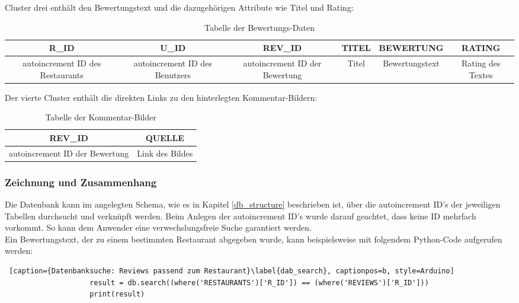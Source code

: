 \documentclass[a4paper,oneside,12pt]{report}
\begin{document}
			 		Cluster drei enthält den Bewertungstext und die dazugehörigen Attribute wie Titel und Rating:
			 		
			 		\begin{table}[H]
			 			\centering
			 			\begin{tabular}{cccccc}
			 				\toprule
			 				\tiny \bf R\_ID & \tiny \bf U\_ID & \tiny \bf REV\_ID & \tiny \bf TITEL & \tiny \bf BEWERTUNG & \tiny \bf RATING\\
			 				\midrule
			 				\tiny autoincrement ID des Restaurants & \tiny autoincrement ID des Benutzers & \tiny autoincrement ID der Bewertung & \tiny Titel & \tiny Bewertungstext & \tiny Rating des Textes\\
			 				\bottomrule
			 			\end{tabular}
			 			\caption[Bewertungs Tabelle]{Tabelle der Bewertungs-Daten}
			 			\label{tab_rev}
			 		\end{table}
				 	
				 	Der vierte Cluster enthält die direkten Links zu den hinterlegten Kommentar-Bildern:
				 	
				 	\begin{table}[H]
				 		\centering
				 		\begin{tabular}{cc}
				 			\toprule
				 			\tiny \bf REV\_ID & \tiny \bf QUELLE\\
				 			\midrule
				 			\tiny autoincrement ID der Bewertung & \tiny Link des Bildes\\
				 			\bottomrule
				 		\end{tabular}
				 		\caption[Bilder Thotelabelle]{Tabelle der Kommentar-Bilder}
				 		\label{tab_pics}
				 	\end{table}
			 	
			 	
				\subsubsection[Zeichnung und Zusammenhang - Johannes Knippel]{Zeichnung und Zusammenhang}
				
					Die Datenbank kann im angelegten Schema, wie es in Kapitel \ref{db_structure} beschrieben ist, über die autoincrement ID's der jeweiligen Tabellen durchsucht und verknüpft werden. Beim Anlegen der autoincrement ID's wurde darauf geachtet, dass keine ID mehrfach vorkommt. So kann dem Anwender eine verwechslungsfreie Suche garantiert werden.\\
					Ein Bewertungstext, der zu einem bestimmten Restaurant abgegeben wurde, kann beispielsweise mit folgendem Python-Code aufgerufen werden:
					\\
					\begin{lstlisting} [caption={Datenbanksuche: Reviews passend zum Restaurant}\label{dab_search}, captionpos=b, style=Arduino]
					result = db.search((where('RESTAURANTS')['R_ID']) == (where('REVIEWS')['R_ID']))
					print(result)
					\end{lstlisting}
					
\end{document}

